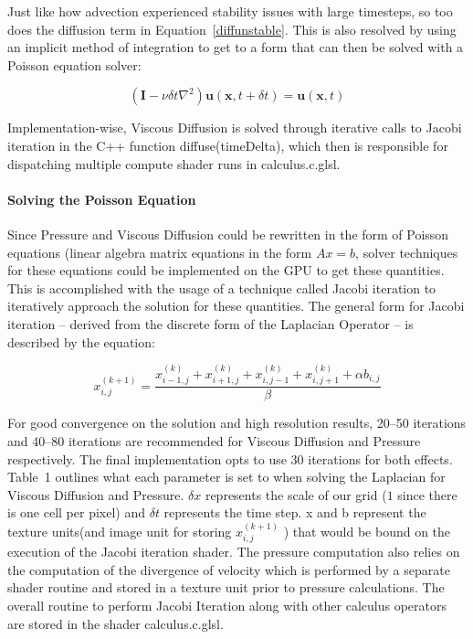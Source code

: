 \documentclass[conference]{IEEEtran}
\begin{document}
Just like how advection experienced stability issues with large timesteps, so too does the diffusion term in Equation~\eqref{diffunstable}. This is also resolved by using an implicit method of integration to get to a form that can then be solved with a Poisson equation solver: 

\begin{equation}
\left(\mathbf{I}-\nu \delta t \nabla^{2}\right) \mathbf{u}(\mathbf{x}, t+\delta t)=\mathbf{u}(\mathbf{x}, t)
\end{equation}


Implementation-wise, Viscous Diffusion is solved through iterative calls to Jacobi iteration in the C++ function diffuse(timeDelta), which then is responsible for dispatching multiple compute shader runs in calculus.c.glsl.

\paragraph{Solving the Poisson Equation} Since Pressure and Viscous Diffusion could be rewritten in the form of Poisson equations (linear algebra matrix equations in the form $Ax=b$, solver techniques for these equations could be implemented on the GPU to get these quantities. This is accomplished with the usage of a technique called Jacobi iteration to iteratively approach the solution for these quantities. The general form for Jacobi iteration -- derived from the discrete form of the Laplacian Operator -- is described by the equation: 

\begin{equation}
x_{i, j}^{(k+1)}=\frac{x_{i-1, j}^{(k)}+x_{i+1, j}^{(k)}+x_{i, j-1}^{(k)}+x_{i, j+1}^{(k)}+\alpha b_{i, j}}{\beta}
\end{equation} 

For good convergence on the solution and high resolution results, 20--50 iterations and 40--80 iterations are recommended for Viscous Diffusion and Pressure respectively\cite{navierstokes}. The final implementation opts to use 30 iterations for both effects. Table~1 outlines what each parameter is set to when solving the Laplacian for Viscous Diffusion and Pressure. $\delta x$ represents the scale of our grid ($1$ since there is one cell per pixel) and $\delta t$ represents the time step. x and b represent the texture units(and image unit for storing $x^{(k+1)}_{i,j}$ ) that would be bound on the execution of the Jacobi iteration shader. The pressure computation also relies on the computation of the divergence of velocity which is performed by a separate shader routine and stored in a texture unit prior to pressure calculations. The overall routine to perform Jacobi Iteration along with other calculus operators are stored in the shader calculus.c.glsl.
\end{document}

